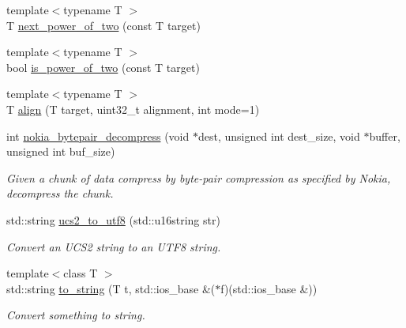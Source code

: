 \begin{DoxyCompactItemize}
\item 
{\footnotesize template$<$typename T $>$ }\\T \mbox{\hyperlink{namespaceeka2l1_1_1common_a1e7ad36590bfb9a8891308b102cb5225}{next\+\_\+power\+\_\+of\+\_\+two}} (const T target)
\item 
{\footnotesize template$<$typename T $>$ }\\bool \mbox{\hyperlink{namespaceeka2l1_1_1common_a7825dab8c5ad388be0dc67236915e218}{is\+\_\+power\+\_\+of\+\_\+two}} (const T target)
\item 
{\footnotesize template$<$typename T $>$ }\\T \mbox{\hyperlink{namespaceeka2l1_1_1common_a1c506a2ff45e6a4439e7f48884eebc81}{align}} (T target, uint32\+\_\+t alignment, int mode=1)
\item 
int \mbox{\hyperlink{namespaceeka2l1_1_1common_ac31c458babed53facf21069ec82d22e9}{nokia\+\_\+bytepair\+\_\+decompress}} (void $\ast$dest, unsigned int dest\+\_\+size, void $\ast$buffer, unsigned int buf\+\_\+size)
\begin{DoxyCompactList}\small\item\em Given a chunk of data compress by byte-\/pair compression as specified by Nokia, decompress the chunk. \end{DoxyCompactList}\item 
\mbox{\label{namespaceeka2l1_1_1common_abf80c8456db5e771a845cb2b850c0c7a}} 
std\+::string \mbox{\hyperlink{namespaceeka2l1_1_1common_abf80c8456db5e771a845cb2b850c0c7a}{ucs2\+\_\+to\+\_\+utf8}} (std\+::u16string str)
\begin{DoxyCompactList}\small\item\em Convert an U\+C\+S2 string to an U\+T\+F8 string. \end{DoxyCompactList}\item 
\mbox{\label{namespaceeka2l1_1_1common_a683cd66063e14eae53540fcd671b3960}} 
{\footnotesize template$<$class T $>$ }\\std\+::string \mbox{\hyperlink{namespaceeka2l1_1_1common_a683cd66063e14eae53540fcd671b3960}{to\+\_\+string}} (T t, std\+::ios\+\_\+base \&($\ast$f)(std\+::ios\+\_\+base \&))
\begin{DoxyCompactList}\small\item\em Convert something to string. \end{DoxyCompactList}\item 

\end{DoxyCompactItemize}
